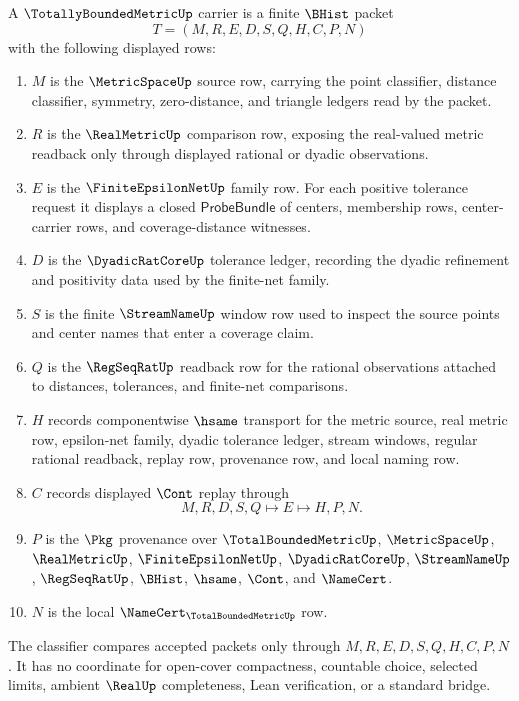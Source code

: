 \begin{definition}
\label{def:totally-bounded-metric-carrier}
A $\TotallyBoundedMetricUp$ carrier is a finite $\BHist$ packet
$$
T=(M,R,E,D,S,Q,H,C,P,N)
$$
with the following displayed rows:
\begin{enumerate}
\item $M$ is the $\MetricSpaceUp$ source row, carrying the point classifier, distance classifier, symmetry, zero-distance, and triangle ledgers read by the packet.
\item $R$ is the $\RealMetricUp$ comparison row, exposing the real-valued metric readback only through displayed rational or dyadic observations.
\item $E$ is the $\FiniteEpsilonNetUp$ family row. For each positive tolerance request it displays a closed $\mathsf{ProbeBundle}$ of centers, membership rows, center-carrier rows, and coverage-distance witnesses.
\item $D$ is the $\DyadicRatCoreUp$ tolerance ledger, recording the dyadic refinement and positivity data used by the finite-net family.
\item $S$ is the finite $\StreamNameUp$ window row used to inspect the source points and center names that enter a coverage claim.
\item $Q$ is the $\RegSeqRatUp$ readback row for the rational observations attached to distances, tolerances, and finite-net comparisons.
\item $H$ records componentwise $\hsame$ transport for the metric source, real metric row, epsilon-net family, dyadic tolerance ledger, stream windows, regular rational readback, replay row, provenance row, and local naming row.
\item $C$ records displayed $\Cont$ replay through
$$
M,R,D,S,Q \longmapsto E \longmapsto H,P,N .
$$
\item $P$ is the $\Pkg$ provenance over $\TotalBoundedMetricUp$, $\MetricSpaceUp$, $\RealMetricUp$, $\FiniteEpsilonNetUp$, $\DyadicRatCoreUp$, $\StreamNameUp$, $\RegSeqRatUp$, $\BHist$, $\hsame$, $\Cont$, and $\NameCert$.
\item $N$ is the local $\NameCert_{\TotalBoundedMetricUp}$ row.
\end{enumerate}
The classifier compares accepted packets only through $M,R,E,D,S,Q,H,C,P,N$. It has no coordinate for open-cover compactness, countable choice, selected limits, ambient $\RealUp$ completeness, Lean verification, or a standard bridge.
\end{definition}

